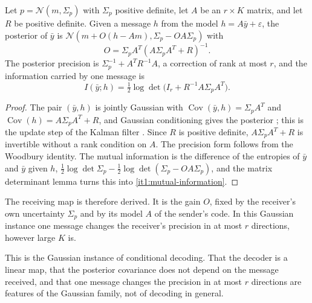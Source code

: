 Let $p=\mathcal N(m,\Sigma_p)$ with $\Sigma_p$ positive definite, let $A$ be an $r\times K$ matrix, and let $R$ be positive definite. Given a message $h$ from the model $h=A\bar y+\varepsilon$, the posterior of $\bar y$ is $\mathcal N(m+O(h-Am),\Sigma_p-OA\Sigma_p)$ with
\begin{equation}
O=\Sigma_pA^T(A\Sigma_pA^T+R)^{-1}.
\label{it1:gain}
\end{equation}
The posterior precision is $\Sigma_p^{-1}+A^TR^{-1}A$, a correction of rank at most $r$, and the information carried by one message is
\begin{equation}
I(\bar y;h)=\tfrac12\log\det\bigl(I_r+R^{-1}A\Sigma_pA^T\bigr).
\label{it1:mutual-information}
\end{equation}
\begin{proof}
The pair $(\bar y,h)$ is jointly Gaussian with $\operatorname{Cov}(\bar y,h)=\Sigma_pA^T$ and $\operatorname{Cov}(h)=A\Sigma_pA^T+R$, and Gaussian conditioning gives the posterior \citep[Section~2.3.1]{Bishop2006}; this is the update step of the Kalman filter \citep{Kalman1960}. Since $R$ is positive definite, $A\Sigma_pA^T+R$ is invertible without a rank condition on $A$. The precision form follows from the Woodbury identity. The mutual information is the difference of the entropies of $\bar y$ and $\bar y$ given $h$, $\frac12\log\det\Sigma_p-\frac12\log\det(\Sigma_p-OA\Sigma_p)$, and the matrix determinant lemma turns this into \cref{it1:mutual-information}.
\end{proof}

The receiving map is therefore derived. It is the gain $O$, fixed by the receiver's own uncertainty $\Sigma_p$ and by its model $A$ of the sender's code. In this Gaussian instance one message changes the receiver's precision in at most $r$ directions, however large $K$ is.

This is the Gaussian instance of conditional decoding. That the decoder is a linear map, that the posterior covariance does not depend on the message received, and that one message changes the precision in at most $r$ directions are features of the Gaussian family, not of decoding in general.

